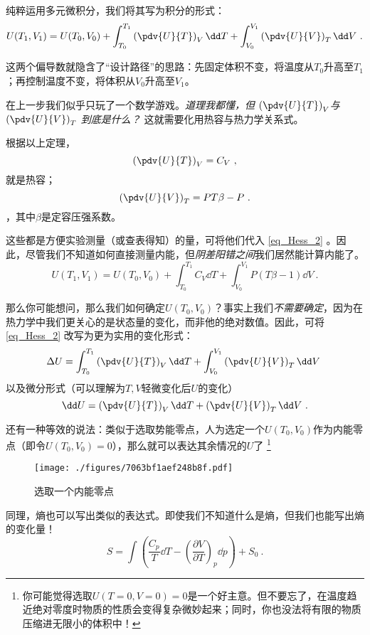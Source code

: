 纯粹运用多元微积分，我们将其写为积分的形式：
\begin{equation}\label{eq_Hess_2}
U(T_1,V_1)=U(T_0,V_0) + \int_{T_0}^{T_1} \left(\pdv{U}{T}\right)_V \dd T + \int_{V_0}^{V_1} \left(\pdv{U}{V}\right)_T \dd V ~.
\end{equation}

这两个偏导数就隐含了“设计路径”的思路：先固定体积不变，将温度从$T_0$升高至$T_1$；再控制温度不变，将体积从$V_0$升高至$V_1$。

在上一步我们似乎只玩了一个数学游戏。\textsl{道理我都懂，但 $\left(\pdv{U}{T}\right)_V$与$ \left(\pdv{U}{V}\right)_T $ 到底是什么？} 这就需要化用热容与热力学关系式。

根据以上定理，$$\left(\pdv{U}{T}\right)_V = C_V~,$$就是热容；$$ \left(\pdv{U}{V}\right)_T  = PT\beta-P ~.$$，其中$\beta$是定容压强系数。

这些都是方便实验测量（或查表得知）的量，可将他们代入 \autoref{eq_Hess_2} 。因此，尽管我们不知道如何直接测量内能，但\textsl{阴差阳错之间}我们居然能计算内能了。
\begin{equation}\label{eq_Hess_1}
U(T_1,V_1)=U(T_0,V_0) + \int_{T_0}^{T_1} C_V \dd T + \int_{V_0}^{V_1} P(T\beta-1) \dd V ~.
\end{equation}



那么你可能想问，那么我们如何确定$U(T_0,V_0)$？事实上我们\textsl{不需要确定}，因为在热力学中我们更关心的是状态量的变化，而非他的绝对数值。因此，可将\autoref{eq_Hess_2} 改写为更为实用的变化形式：
\begin{equation}
\Delta U = \int_{T_0}^{T_1} \left(\pdv{U}{T}\right)_V \dd T + \int_{V_0}^{V_1} \left(\pdv{U}{V}\right)_T \dd V ~
\end{equation}
以及微分形式（可以理解为$T,V$轻微变化后$U$的变化）
\begin{equation}
\dd U =  \left(\pdv{U}{T}\right)_V \dd T +\left(\pdv{U}{V}\right)_T \dd V ~.
\end{equation}

还有一种等效的说法：类似于选取势能零点，人为选定一个$U(T_0,V_0)$作为内能零点（即令$U(T_0,V_0)=0$），那么就可以表达其余情况的$U$了 \footnote{你可能觉得选取$U(T = 0,V = 0)=0$是一个好主意。但不要忘了，在温度趋近绝对零度时物质的性质会变得复杂微妙起来；同时，你也没法将有限的物质压缩进无限小的体积中！}

\begin{figure}[ht]
\centering
\texttt{[image: ./figures/7063bf1aef248b8f.pdf]}
\caption{选取一个内能零点} \label{fig_Hess_6}
\end{figure}

同理，熵也可以写出类似的表达式。即使我们不知道什么是熵，但我们也能写出熵的变化量！
\begin{equation}
S=\int \left(\frac{C_p}{T}\dd T-\left(\frac{\partial V}{\partial T}\right)_p\dd p\right)+S_0~.
\end{equation}